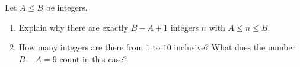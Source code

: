 Let $A\le B$ be integers.
\begin{enumerate}
\item[(a)] Explain why there are exactly $B-A+1$ integers $n$ with $A\le n\le B$.
\item[(b)] How many integers are there from $1$ to $10$ inclusive? What does the number $B-A=9$ count in this case?
\end{enumerate}
